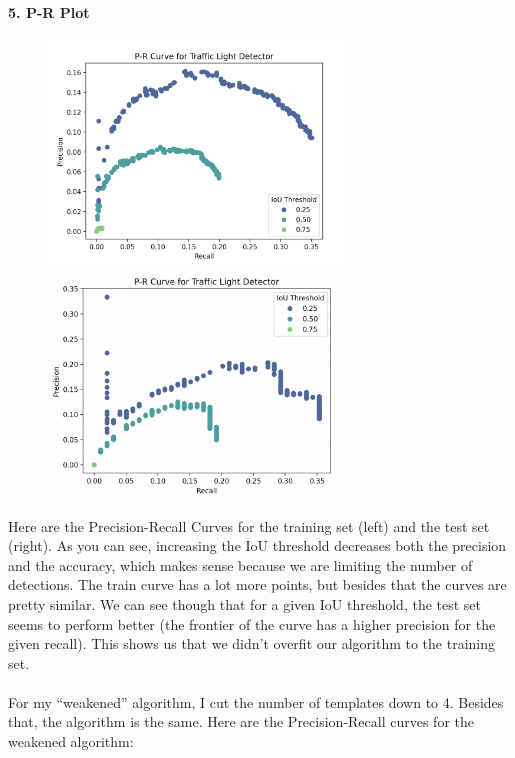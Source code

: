 \documentclass[12pt,letterpaper]{article} \usepackage{fullpage}
\begin{document}
\newpage
\textbf{5. P-R Plot}\\
\begin{figure}[htp]
    \centering
    \includegraphics[width=8cm]{img/pr-train.png}
    \includegraphics[width=8cm]{img/pr-test.png}
\end{figure}
Here are the Precision-Recall Curves for the training set (left) and the test set (right).
As you can see, increasing the IoU threshold decreases both the precision and the accuracy,
which makes sense because we are limiting the number of detections. The train curve has a
lot more points, but besides that the curves are pretty similar. We can see though that
for a given IoU threshold, the test set seems to perform better (the frontier of the curve
has a higher precision for the given recall). This shows us that we didn't overfit our
algorithm to the training set.
\\\\
For my ``weakened'' algorithm, I cut the number of templates down to 4. Besides that,
the algorithm is the same. Here are the Precision-Recall curves for the weakened algorithm:\\
\end{document}
